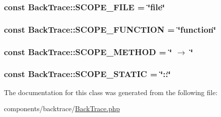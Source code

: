 \hypertarget{class_back_trace_9efefb3ed5ea7ee8e131f2d8a769fea5}{
\subsubsection[{SCOPE\_\-FILE}]{\setlength{\rightskip}{0pt plus 5cm}const {\bf BackTrace::SCOPE\_\-FILE} = \char`\"{}file\char`\"{}}}
\label{class_back_trace_9efefb3ed5ea7ee8e131f2d8a769fea5}


\hypertarget{class_back_trace_ae456bc0b86081f2f7910c0772803224}{
\subsubsection[{SCOPE\_\-FUNCTION}]{\setlength{\rightskip}{0pt plus 5cm}const {\bf BackTrace::SCOPE\_\-FUNCTION} = \char`\"{}function\char`\"{}}}
\label{class_back_trace_ae456bc0b86081f2f7910c0772803224}


\hypertarget{class_back_trace_20828cf0730b25b234bd8b63614988f5}{
\subsubsection[{SCOPE\_\-METHOD}]{\setlength{\rightskip}{0pt plus 5cm}const {\bf BackTrace::SCOPE\_\-METHOD} = \char`\"{} $\rightarrow$ \char`\"{}}}
\label{class_back_trace_20828cf0730b25b234bd8b63614988f5}


\hypertarget{class_back_trace_39bb2bf7f6eedb012f02ca7a78218f4d}{
\subsubsection[{SCOPE\_\-STATIC}]{\setlength{\rightskip}{0pt plus 5cm}const {\bf BackTrace::SCOPE\_\-STATIC} = \char`\"{}::\char`\"{}}}
\label{class_back_trace_39bb2bf7f6eedb012f02ca7a78218f4d}




The documentation for this class was generated from the following file:\begin{CompactItemize}
\item 
components/backtrace/\hyperlink{_back_trace_8php}{BackTrace.php}\end{CompactItemize}
